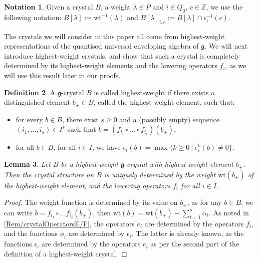 \documentclass[a4paper,12pt]{article}
\theoremstyle{definition}
\newtheorem{definition}{Definition}[section]
\newtheorem{notation}[definition]{Notation}
\theoremstyle{plain}
\newtheorem{lemma}[definition]{Lemma}
\theoremstyle{remark}
\newcommand\bbZ{\mathbb{Z}}
\begin{document}
\begin{notation}
Given a crystal $B$, a weight $\lambda\in P$ and $i\in Q_0$, $c\in\bbZ$, we use the following notation: $B[\lambda]:=\mathrm{wt}^{-1}(\lambda)$ and $B[\lambda]_{i,c}:=B[\lambda]\cap\epsilon_i^{-1}(c)$.
\end{notation}

 
The crystals we will consider in this paper all come from highest-weight representations of the quantised universal enveloping algebra of $\mathfrak{g}$. We will next introduce highest-weight crystals, and show that such a crystal is completely determined by its highest-weight elements and the lowering operators ${f}_i$, as we will use this result later in our proofs.

\begin{definition}
A $\mathfrak{g}$-crystal $B$ is called highest-weight if there exists a distinguished element $b_+\in B$, called the highest-weight element, such that:
\begin{itemize}
\item for every $b\in B$, there exist $s\geq0$ and  a (possibly empty) sequence $(i_1,\ldots,i_s)\in I^s$ such that $b=({f_{i_1}}\circ\ldots\circ{f_{i_s}})(b_+)$,
\item for all $b\in B$, for all $i\in I$, we have $\epsilon_i(b)=\max\{k\geq0\ \vert\ e_i^k(b)\ne0\}$.
\end{itemize}
\end{definition}

\begin{lemma}\label{Lem/HWcrystalsF-operators}
Let $B$ be a highest-weight $\mathfrak{g}$-crystal with highest-weight element $b_+$. Then the crystal structure on $B$ is uniquely determined by the weight $\mathrm{wt}(b_+)$ of the highest-weight element, and the lowering operators $f_i$ for all $i \in I$.
\end{lemma}

\begin{proof}
The weight function is determined by its value on $b_+$, as for any $b\in B$, we can write $b={f_{i_1}}\circ\ldots {f_{i_s}}(b_+)$, then $\mathrm{wt}(b)=\mathrm{wt}(b_+)-\sum_{t=1}^s\alpha_t$. As noted in \cref{Rem/crystalOperatorsE/F}, the operators $e_i$ are determined by the operators $f_i$, and the functions $\phi_i$ are determined by $\epsilon_i$. The latter is already known, as the functions $\epsilon_i$ are determined by the operators $e_i$ as per the second part of the definition of a highest-weight crystal.
\end{proof}
\end{document}
